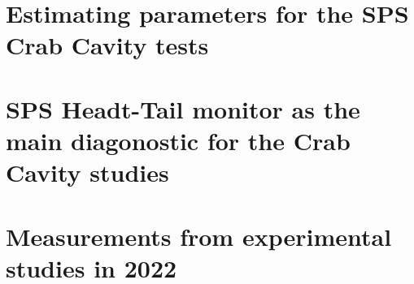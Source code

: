 \documentclass[12pt,twoside]{report} %
\begin{document}
\chapter{Estimating parameters for the SPS Crab Cavity tests}\label{ch:app_C}

\chapter{SPS Headt-Tail monitor as the main diagonostic for the Crab Cavity studies}\label{ch:app_HT_monitor}

\chapter{Measurements from experimental studies in 2022}\label{ch:app_measurments_22}


%

\clearpage

\printglossary[nonumberlist]

\backmatter
\printbibliography
{}
\end{document}
